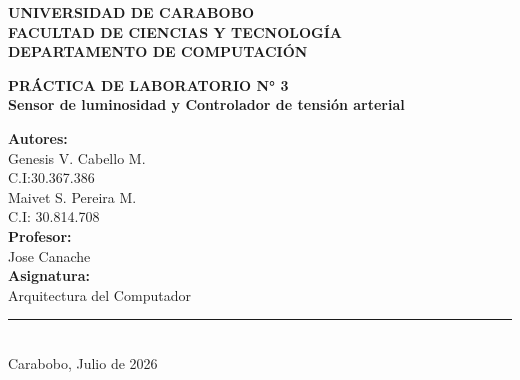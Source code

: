 \documentclass[12pt, a4paper]{article}
\begin{document}
\begin{titlepage}
    \begin{center}
        \textbf{\large UNIVERSIDAD DE CARABOBO} \\
        \textbf{\large FACULTAD DE CIENCIAS Y TECNOLOGÍA} \\
        \textbf{\large DEPARTAMENTO DE COMPUTACIÓN} \\
        \vspace*{0.5cm}
       
        
        \vspace*{6cm} %
        
        \textbf{\LARGE PRÁCTICA DE LABORATORIO N° 3} \\[0.4cm]
        \textbf{\Large Sensor de luminosidad y Controlador de tensión arterial} \\
        
        \vspace*{6.8cm} %
        
        \begin{flushright}
            \begin{minipage}{0.5\linewidth}
                \normalsize
                \textbf{Autores:} \\
                Genesis V. Cabello M. \\
                \vspace*{0.3cm}
                C.I:30.367.386\\
                Maivet S. Pereira M.\\
                \vspace*{0.3cm}
                C.I: 30.814.708\\
                \textbf{Profesor:} \\
                \vspace*{0.3cm}
                Jose Canache \\
                \textbf{Asignatura:} \\
                Arquitectura del Computador
            \end{minipage}
        \end{flushright}
        
        \vfill %
        
        \rule{\linewidth}{0.5mm} \\ %
        \vspace*{0.2cm}
        \normalsize Carabobo, Julio de 2026
        
    \end{center}
\end{titlepage}
\end{document}
